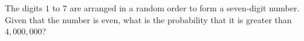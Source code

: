 The digits $1$ to $7$ are arranged in a random order to form a seven-digit number. Given that the number is even, what is the probability that it is greater than $4{,}000{,}000$?

